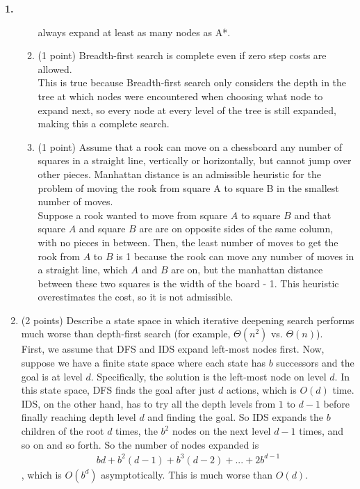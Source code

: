 \documentclass[12pt]{amsart}
\newenvironment{statement}[1]{\smallskip\noindent\color[rgb]{0.0,0.0,0.0} {\bf #1.}}{}
\theoremstyle{definition}
\theoremstyle{remark}
\newcommand{\1}{\mathds{1}}
\begin{document}
\begin{statement}{1}
\begin{enumerate}
\begin{enumerate}
        always expand at least as many nodes as A*.
        \item (1 point) Breadth-first search is complete even if zero step costs are allowed. 
        \\ This is true because Breadth-first search only considers the depth in the tree at which nodes were encountered when choosing what node to 
        expand next, so every node at every level of the tree is still expanded, making this a complete search. 
        \item (1 point) Assume that a rook can move on a chessboard any number of squares in a straight line, vertically or horizontally, but cannot jump over other pieces. Manhattan distance is an admissible heuristic for the problem of moving the rook from square A to square B in the smallest number of moves.
        \\ Suppose a rook wanted to move from square $A$ to square $B$ and that square $A$ and square $B$ are are on opposite sides of the same column, with no pieces in between. Then, the least number of 
        moves to get the rook from $A$ to $B$ is 1 because the rook can move any number of moves in a straight line, which $A$ and $B$ are on, but the manhattan distance between these two squares is the width of the board - 1. This heuristic overestimates 
        the cost, so it is not admissible. 
    \end{enumerate}
    \item (2 points) Describe a state space in which iterative deepening search performs much worse than depth-first search (for example, $\Theta(n^2)$ vs. $\Theta(n)$).
    \\ First, we assume that DFS and IDS expand left-most nodes first. Now, suppose we have a finite state space where each state has $b$ successors and the 
    goal is at level $d$. Specifically, the solution is the left-most node on level $d$. In this state space, DFS finds the goal after just $d $ actions, which is 
    $O(d)$ time. IDS, on the other hand, has to try all the depth levels from $1$ to $d-1$ before finally reaching depth level $d$ and finding the goal. So IDS expands the $b$ children of the root $d$ times, the $b^2$ nodes on the next level $d-1$ times, and so on and so forth. 
    So the number of nodes expanded is 
    \begin{align*}
        bd + b^2(d - 1) + b^3 (d - 2) + ... + 2b^{d - 1}
    \end{align*}
    , which is $O(b^d)$ asymptotically. This is much worse than $O(d)$. 

\end{enumerate}


\end{statement}
\end{document}
